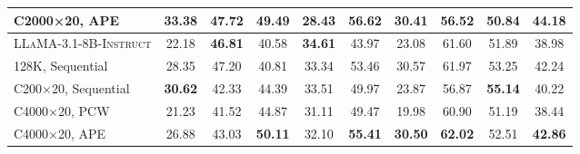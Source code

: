 \begin{table}[t]
{{\begin{tabular}{l|ccccccccc}
\rowcolor{cyan!10}C2000×20, APE & \textbf{33.38} & \textbf{47.72} & 49.49 & \textbf{28.43} & \textbf{56.62} & \textbf{30.41} & 56.52 & \textbf{50.84} & \textbf{44.18} \\
\midrule
\textsc{LLaMA-3.1-8B-Instruct} & 22.18 & \textbf{46.81} & 40.58 & \textbf{34.61} & 43.97 & 23.08 & 61.60 & 51.89 & 38.98 \\
\textcolor{darkgray!50}{128K, Sequential} & \textcolor{darkgray!50}{28.35} & \textcolor{darkgray!50}{47.20} & \textcolor{darkgray!50}{40.81} & \textcolor{darkgray!50}{33.34} & \textcolor{darkgray!50}{53.46} & \textcolor{darkgray!50}{30.57} & \textcolor{darkgray!50}{61.97} & \textcolor{darkgray!50}{53.25} & \textcolor{darkgray!50}{42.24} \\
C200×20, Sequential & \textbf{30.62} & 42.33 & 44.39 & 33.51 & 49.97 & 23.87 & 56.87 & \textbf{55.14} & 40.22 \\
C4000×20, PCW & 21.23 & 41.52 & 44.87 & 31.11 & 49.47 & 19.98 & 60.90 & 51.19 & 38.44 \\
\rowcolor{cyan!10}C4000×20, APE & 26.88 & 43.03 & \textbf{50.11} & 32.10 & \textbf{55.41} & \textbf{30.50} & \textbf{62.02} & 52.51 & \textbf{42.86} \\
\bottomrule
\end{tabular}}}
\label{tab:rag_longbench}
\end{table}